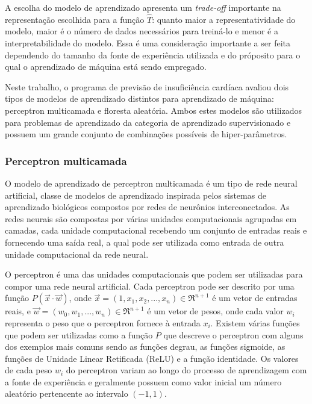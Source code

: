 A escolha do modelo de aprendizado apresenta um \textit{trade-off} importante na representação escolhida para a função $\hat{T}$: quanto maior a representatividade do modelo, maior é o número de dados necessários para treiná-lo\cite[p.8]{machine_learning} e menor é a interpretabilidade do modelo\cite[p.25]{statistical_learning}. Essa é uma consideração importante a ser feita dependendo do tamanho da fonte de experiência utilizada e do próposito para o qual o aprendizado de máquina está sendo empregado.

Neste trabalho, o programa de previsão de insuficiência cardíaca avaliou dois tipos de modelos de aprendizado distintos para aprendizado de máquina: perceptron multicamada e floresta aleatória. Ambos estes modelos são utilizados para problemas de aprendizado da categoria de aprendizado supervisionado e possuem um grande conjunto de combinações possíveis de hiper-parâmetros.

\subsubsection{Perceptron multicamada}

O modelo de aprendizado de perceptron multicamada é um tipo de rede neural artificial, classe de modelos de aprendizado inspirada pelos sistemas de aprendizado biológicos compostos por redes de neurônios interconectados. As redes neurais são compostas por várias unidades computacionais agrupadas em camadas, cada unidade computacional recebendo um conjunto de entradas reais e fornecendo uma saída real, a qual pode ser utilizada como entrada de outra unidade computacional da rede neural\cite[p.82]{machine_learning}.

O perceptron é uma das unidades computacionais que podem ser utilizadas para compor uma rede neural artificial. Cada perceptron pode ser descrito por uma função $P(\vec{x} \cdot \vec{w})$, onde $\vec{x} = (1, x_{1}, x_{2}, ..., x_{n}) \in \Re^{n+1}$ é um vetor de entradas reais, e $\vec{w} = (w_{0}, w_{1}, ..., w_{n}) \in \Re^{n+1}$ é um vetor de pesos, onde cada valor $w_{i}$ representa o peso que o perceptron fornece à entrada $x_{i}$. Existem várias funções que podem ser utilizadas como a função $P$ que descreve o perceptron com alguns dos exemplos mais comuns sendo as funções degrau, as funções sigmoide, as funções de Unidade Linear Retificada (ReLU) e a função identidade. Os valores de cada peso $w_{i}$ do perceptron variam ao longo do processo de aprendizagem com a fonte de experiência e geralmente possuem como valor inicial um número aleatório pertencente ao intervalo $(-1, 1)$.

